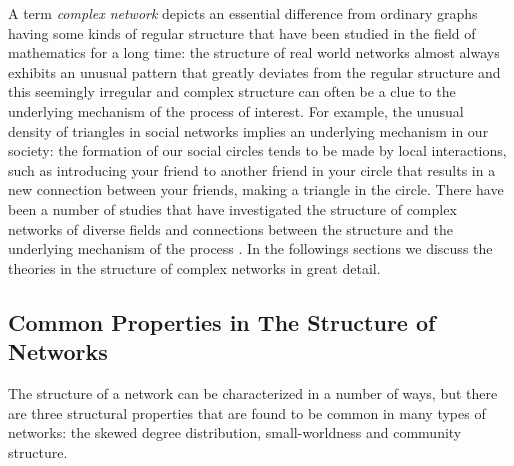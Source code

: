 \documentclass{article}
\begin{document}
	A term \textit{complex network} depicts an essential difference from ordinary graphs having some kinds of regular structure that have been studied in the field of mathematics for a long time: the structure of real world networks almost always exhibits an unusual pattern that greatly deviates from the regular structure and this seemingly irregular and complex structure can often be a clue to the underlying mechanism of the process of interest.  For example, the unusual density of triangles in social networks implies an underlying mechanism in our society: the formation of our social circles tends to be made by local interactions, such as introducing your friend to another friend in your circle that results in a new connection between your friends, making a triangle in the circle. There have been a number of studies that have investigated the structure of complex networks of diverse fields and connections between the structure and the underlying mechanism of the process \cite{Strogatz2001, Newman03thestructure, StatisticalMechanics, boccaletti06}. In the followings sections we discuss the theories in the structure of complex networks in great detail.
	
	\subsection{Common Properties in The Structure of Networks}
	The structure of a network can be characterized in a number of ways, but there are three structural properties that are found to be common in many types of networks: the skewed degree distribution, small-worldness and community structure.
	
\end{document}
